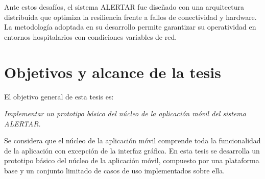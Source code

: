Ante estos desafíos, el sistema ALERTAR fue diseñado con una arquitectura distribuida que optimiza la resiliencia frente a fallos de conectividad y hardware. La metodología adoptada en su desarrollo permite garantizar su operatividad en entornos hospitalarios con condiciones variables de red.


\section{Objetivos y alcance de la tesis}
El objetivo general de esta tesis es:

\begin{center}
    \textit{Implementar un prototipo básico del núcleo de la aplicación móvil del sistema ALERTAR.} 
\end{center}

Se considera que el núcleo de la aplicación móvil comprende toda la funcionalidad de la aplicación con excepción de la interfaz gráfica. En esta tesis se desarrolla un prototipo básico del núcleo de la aplicación móvil, compuesto por una plataforma base y un conjunto limitado de casos de uso implementados sobre ella.

